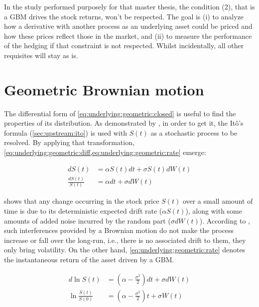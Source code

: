 \documentclass[12pt,a4paper]{report}
\newcommand{\dBm}{dW\left(t\right)}
\newcommand{\Bm}{W\left(t\right)}
\newcommand{\St}{S\left(t\right)}
\newcommand{\dSt}{dS\left(t\right)}
\newcommand{\dSr}{\frac{\dSt}{\St}}
\newcommand{\Scontinousdiff}{d\St &= \alpha \St dt + \sigma \St \dBm}
\newcommand{\Scontinuousrate}{\dSr &= \alpha dt + \sigma \dBm}
\begin{document}
In the study performed purposely for that master thesis, the condition (2), that is a GBM drives the stock returns, won't be respected. 
The goal is (i) to analyze how a derivative with another process as an underlying asset could be priced and how these prices reflect those in the market, and (ii) to measure the performance of the hedging if that constraint is not respected.
Whilst incidentally, all other requisites will stay as is.


\section{Geometric Brownian motion}
\label{sec:underlying:derivation}

The differential form of \cref{eq:underlying:geometric:closed} is useful to find the properties of its distribution.
As demonstrated by \citet{shreve}, in order to get it, the Itô's formula (\cref{sec:upstream:ito}) is used with $S(t)$ as a stochastic process to be resolved. 
By applying that transformation, \cref{eq:underlying:geometric:diff,eq:underlying:geometric:rate} emerge:
 
\begin{center}
  \begin{subequations}
    \begin{align}
      \Scontinousdiff \label{eq:underlying:geometric:diff} \\
      \Scontinuousrate \label{eq:underlying:geometric:rate}
    \end{align}
  \end{subequations}
\end{center}

 shows that any change occurring in the stock price $S(t)$ over a small amount of time is due to its deterministic expected drift rate ($\alpha \St$), along with some amounts of added noise incurred by the random part ($\sigma d\Bm$). 
According to \citet{shreve}, such interferences provided by a Brownian motion do not make the process increase or fall over the long-run, i.e., there is no associated drift to them, they only bring volatility.
On the other hand, \cref{eq:underlying:geometric:rate} denotes the instantaneous return of the asset driven by a GBM.

\begin{align}
  d\ln{\St} &= (\alpha - \frac{\sigma ^2}{2}) dt 
              + \sigma d\Bm \label{eq:underlying:logreturn:diff} \\
  \ln{\frac{\St}{S(0)}} &= (\alpha - \frac{\sigma ^2}{2}) t 
              + \sigma \Bm \label{eq:underlying:log:return}
\end{align}
\end{document}
